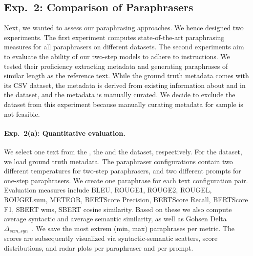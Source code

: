 \subsection{Exp.\ 2: Comparison of Paraphrasers}
\label{subsec:comp_paraphrasers_setup}

Next, we wanted to assess our paraphrasing approaches.
We hence designed two experiments.
The first experiment computes state-of-the-art paraphrasing measures for all paraphrasers on different datasets.
The second experiments aim to evaluate the ability of our two-step models to adhere to instructions.
We tested their proficiency extracting metadata and generating paraphrases of similar length as the reference text.
While the \dataBlog{} ground truth metadata comes with its CSV dataset, the \dataStudent{} metadata is derived from existing information about and in the dataset, and the \dataGutenberg{} metadata is manually curated.
We decide to exclude the \dataPan{} dataset from this experiment because manually curating metadata for \dataPan{} sample is not feasible.

\paragraph{Exp.\ 2(a): Quantitative evaluation.}

We select one text from the \dataBlog{}, the \dataGutenberg{} and the \dataStudent{} dataset, respectively.
For the \dataGutenberg{} dataset, we load ground truth metadata. %
The paraphraser configurations contain two different temperatures for two-step paraphrasers, and two different prompts for one-step paraphrasers.
We create one paraphrase for each text configuration pair.
Evaluation measures include BLEU, ROUGE1, ROUGE2, ROUGEL, ROUGE\-Lsum, METEOR, BERT\-Score Precision, BERT\-Score Recall, BERT\-Score F1, SBERT \ac{wms}, SBERT cosine similarity.
Based on these we also compute average syntactic and average semantic similarity, as well as Gohsen Delta $\Delta_{sem,syn}$~\citep{gohsen_captions_2023}.
We save the most extrem (min, max) paraphrases per metric.
The scores are subsequently visualized via syntactic-semantic scatters, score distributions, and radar plots per paraphraser and per prompt. 

